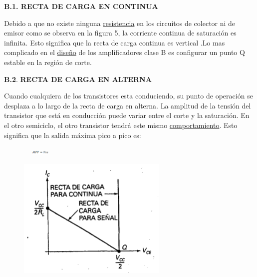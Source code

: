 \documentclass[12pt]{article}
\begin{document}
\par

\textbf{B.1. RECTA DE CARGA EN CONTINUA}\par

Debido a que no existe ninguna \href{https://www.monografias.com/trabajos10/restat/restat.shtml}{resistencia} en los circuitos de colector ni de emisor como se observa en la figura 5, la corriente continua de saturación es infinita. Esto significa que la recta de carga continua es vertical .Lo mas complicado en el \href{https://www.monografias.com/trabajos13/diseprod/diseprod.shtml}{diseño} de los amplificadores clase B es configurar un punto Q estable en la región de corte.\par

\textbf{B.2}. \textbf{RECTA DE CARGA EN ALTERNA}\par

Cuando cualquiera de los transistores esta conduciendo, su punto de operación se desplaza a lo largo de la recta de carga en alterna. La amplitud de la tensión del transistor que está en conducción puede variar entre el corte y la saturación. En el otro semiciclo, el otro transistor tendrá este mismo \href{https://www.monografias.com/trabajos16/comportamiento-humano/comportamiento-humano.shtml}{comportamiento}. Esto significa que la salida máxima pico a pico es:\par




\begin{figure}[H]
	\begin{Center}
		\includegraphics[width=0.69in,height=0.09in]{./media/image8.gif}
	\end{Center}
\end{figure}



\par




\begin{figure}[H]
	\begin{Center}
		\includegraphics[width=2.81in,height=2.27in]{./media/image9.gif}
	\end{Center}
\end{figure}
\end{document}
